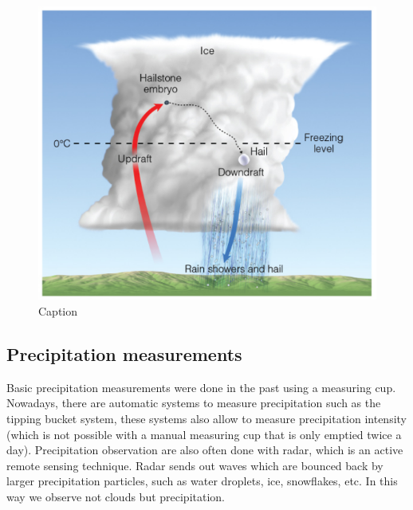\documentclass[12pt,oneside]{book}
\begin{document}
\begin{figure}

{\centering \includegraphics[width=0.9\linewidth]{figures/Figure348} 

}

\caption{Caption}\label{fig:Hail2}
\end{figure}

\subsection{Precipitation
measurements}\label{precipitation-measurements}

Basic precipitation measurements were done in the past using a measuring
cup. Nowadays, there are automatic systems to measure precipitation such
as the tipping bucket system, these systems also allow to measure
precipitation intensity (which is not possible with a manual measuring
cup that is only emptied twice a day). Precipitation observation are
also often done with radar, which is an active remote sensing technique.
Radar sends out waves which are bounced back by larger precipitation
particles, such as water droplets, ice, snowflakes, etc. In this way we
observe not clouds but precipitation.
\end{document}
